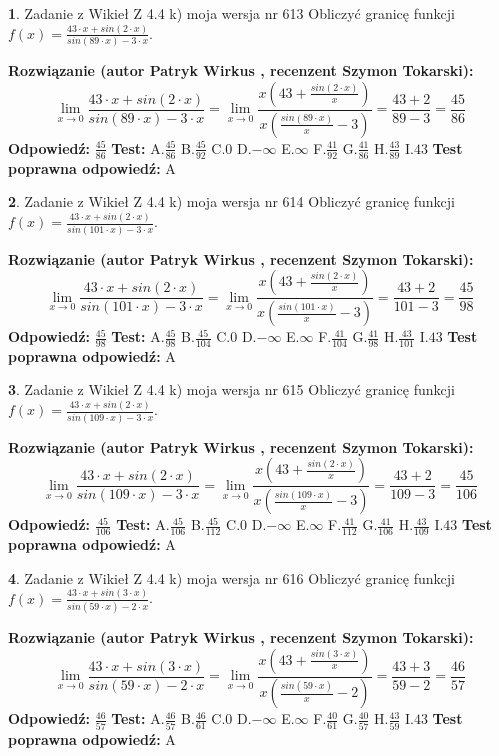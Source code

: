 \documentclass[12pt, a4paper]{article}
\theoremstyle{definition} %
\newtheorem{zad}{}
\newcommand{\zadStart}[1]{\begin{zad}#1\newline}
\newcommand{\zadStop}{\end{zad}}
\newcommand{\rozwStart}[2]{\noindent \textbf{Rozwiązanie (autor #1 , recenzent #2): }\newline}
\newcommand{\rozwStop}{\newline}
\newcommand{\odpStart}{\noindent \textbf{Odpowiedź:}\newline}
\newcommand{\odpStop}{\newline}
\newcommand{\testStart}{\noindent \textbf{Test:}\newline}
\newcommand{\testStop}{\newline}
\newcommand{\kluczStart}{\noindent \textbf{Test poprawna odpowiedź:}\newline}
\newcommand{\kluczStop}{\newline}
\begin{document}
\zadStart{Zadanie z Wikieł Z 4.4 k) moja wersja nr 613}
Obliczyć granicę funkcji $f(x)=\frac{43\cdot x +sin(2\cdot x)}{sin(89\cdot x) -3\cdot x}$.
\zadStop
\rozwStart{Patryk Wirkus}{Szymon Tokarski}
$$\lim\limits_{x\to 0}\frac{43\cdot x +sin(2\cdot x)}{sin(89\cdot x) -3\cdot x}
=\lim\limits_{x\to 0}\frac{x(43+\frac{sin(2\cdot x)}{x})}{x(\frac{sin(89\cdot x)}{x}-3)}
=\frac{43+2}{89-3} = \frac{45}{86}$$
\rozwStop
\odpStart
$\frac{45}{86}$
\odpStop
\testStart
A.$\frac{45}{86}$
B.$\frac{45}{92}$
C.$0$
D.$-\infty$
E.$\infty$
F.$\frac{41}{92}$
G.$\frac{41}{86}$
H.$\frac{43}{89}$
I.$43$
\testStop
\kluczStart
A
\kluczStop



\zadStart{Zadanie z Wikieł Z 4.4 k) moja wersja nr 614}
Obliczyć granicę funkcji $f(x)=\frac{43\cdot x +sin(2\cdot x)}{sin(101\cdot x) -3\cdot x}$.
\zadStop
\rozwStart{Patryk Wirkus}{Szymon Tokarski}
$$\lim\limits_{x\to 0}\frac{43\cdot x +sin(2\cdot x)}{sin(101\cdot x) -3\cdot x}
=\lim\limits_{x\to 0}\frac{x(43+\frac{sin(2\cdot x)}{x})}{x(\frac{sin(101\cdot x)}{x}-3)}
=\frac{43+2}{101-3} = \frac{45}{98}$$
\rozwStop
\odpStart
$\frac{45}{98}$
\odpStop
\testStart
A.$\frac{45}{98}$
B.$\frac{45}{104}$
C.$0$
D.$-\infty$
E.$\infty$
F.$\frac{41}{104}$
G.$\frac{41}{98}$
H.$\frac{43}{101}$
I.$43$
\testStop
\kluczStart
A
\kluczStop



\zadStart{Zadanie z Wikieł Z 4.4 k) moja wersja nr 615}
Obliczyć granicę funkcji $f(x)=\frac{43\cdot x +sin(2\cdot x)}{sin(109\cdot x) -3\cdot x}$.
\zadStop
\rozwStart{Patryk Wirkus}{Szymon Tokarski}
$$\lim\limits_{x\to 0}\frac{43\cdot x +sin(2\cdot x)}{sin(109\cdot x) -3\cdot x}
=\lim\limits_{x\to 0}\frac{x(43+\frac{sin(2\cdot x)}{x})}{x(\frac{sin(109\cdot x)}{x}-3)}
=\frac{43+2}{109-3} = \frac{45}{106}$$
\rozwStop
\odpStart
$\frac{45}{106}$
\odpStop
\testStart
A.$\frac{45}{106}$
B.$\frac{45}{112}$
C.$0$
D.$-\infty$
E.$\infty$
F.$\frac{41}{112}$
G.$\frac{41}{106}$
H.$\frac{43}{109}$
I.$43$
\testStop
\kluczStart
A
\kluczStop



\zadStart{Zadanie z Wikieł Z 4.4 k) moja wersja nr 616}
Obliczyć granicę funkcji $f(x)=\frac{43\cdot x +sin(3\cdot x)}{sin(59\cdot x) -2\cdot x}$.
\zadStop
\rozwStart{Patryk Wirkus}{Szymon Tokarski}
$$\lim\limits_{x\to 0}\frac{43\cdot x +sin(3\cdot x)}{sin(59\cdot x) -2\cdot x}
=\lim\limits_{x\to 0}\frac{x(43+\frac{sin(3\cdot x)}{x})}{x(\frac{sin(59\cdot x)}{x}-2)}
=\frac{43+3}{59-2} = \frac{46}{57}$$
\rozwStop
\odpStart
$\frac{46}{57}$
\odpStop
\testStart
A.$\frac{46}{57}$
B.$\frac{46}{61}$
C.$0$
D.$-\infty$
E.$\infty$
F.$\frac{40}{61}$
G.$\frac{40}{57}$
H.$\frac{43}{59}$
I.$43$
\testStop
\kluczStart
A
\kluczStop
\end{document}
